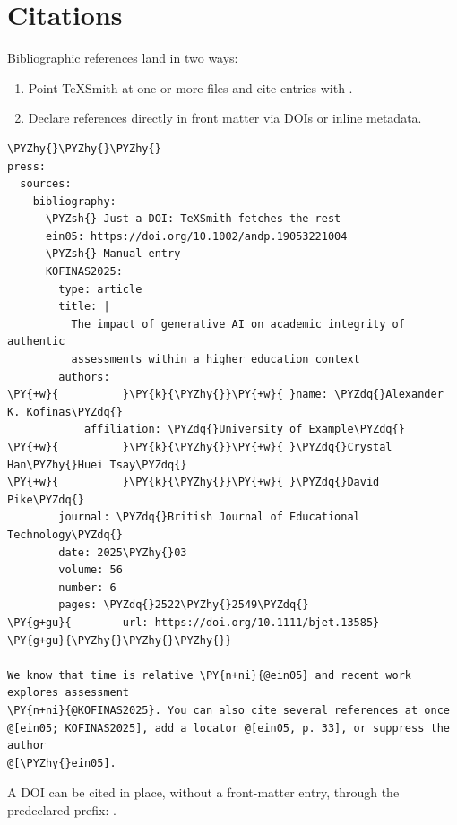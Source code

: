 \documentclass[a4paper,twoside]{article}
\begin{document}
\section{Citations}
Bibliographic references land in two ways:
\begin{enumerate}
\item Point TeXSmith at one or more  files and cite entries with .
\item Declare references directly in front matter via DOIs or inline metadata.
\end{enumerate}
\begin{tscode}[lang=md, engine=pygments]
\begin{Verbatim}[commandchars=\\\{\},breaklines, breakanywhere, commandchars=\\\{\}]
\PYZhy{}\PYZhy{}\PYZhy{}
press:
  sources:
    bibliography:
      \PYZsh{} Just a DOI: TeXSmith fetches the rest
      ein05: https://doi.org/10.1002/andp.19053221004
      \PYZsh{} Manual entry
      KOFINAS2025:
        type: article
        title: |
          The impact of generative AI on academic integrity of authentic
          assessments within a higher education context
        authors:
\PY{+w}{          }\PY{k}{\PYZhy{}}\PY{+w}{ }name: \PYZdq{}Alexander K. Kofinas\PYZdq{}
            affiliation: \PYZdq{}University of Example\PYZdq{}
\PY{+w}{          }\PY{k}{\PYZhy{}}\PY{+w}{ }\PYZdq{}Crystal Han\PYZhy{}Huei Tsay\PYZdq{}
\PY{+w}{          }\PY{k}{\PYZhy{}}\PY{+w}{ }\PYZdq{}David Pike\PYZdq{}
        journal: \PYZdq{}British Journal of Educational Technology\PYZdq{}
        date: 2025\PYZhy{}03
        volume: 56
        number: 6
        pages: \PYZdq{}2522\PYZhy{}2549\PYZdq{}
\PY{g+gu}{        url: https://doi.org/10.1111/bjet.13585}
\PY{g+gu}{\PYZhy{}\PYZhy{}\PYZhy{}}

We know that time is relative \PY{n+ni}{@ein05} and recent work explores assessment
\PY{n+ni}{@KOFINAS2025}. You can also cite several references at once
@[ein05; KOFINAS2025], add a locator @[ein05, p. 33], or suppress the author
@[\PYZhy{}ein05].
\end{Verbatim}
\end{tscode}
A DOI can be cited in place, without a front-matter entry, through the
predeclared  prefix: .
\end{document}
